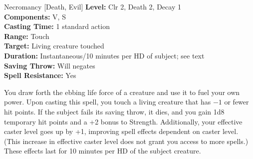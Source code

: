 {Necromancy [Death, Evil]}
{
	\textbf{Level:}
	Clr 2, Death 2, Decay 1\\
	\textbf{Components:}
	V, S\\
	\textbf{Casting Time:}
	1 standard action\\
	\textbf{Range:}
	Touch\\
	\textbf{Target:}
	Living creature touched\\
	\textbf{Duration:}
	Instantaneous/10 minutes per HD of subject; see text\\
	\textbf{Saving Throw:}
	Will negates\\
	\textbf{Spell Resistance:}
	Yes\\
}
{
	You draw forth the ebbing life force of a creature and use it to fuel your own power. Upon casting this spell, you touch a living creature that has $-1$ or fewer hit points. If the subject fails its saving throw, it dies, and you gain 1d8 temporary hit points and a +2 bonus to Strength. Additionally, your effective caster level goes up by +1, improving spell effects dependent on caster level. (This increase in effective caster level does not grant you access to more spells.) These effects last for 10 minutes per HD of the subject creature.

}
